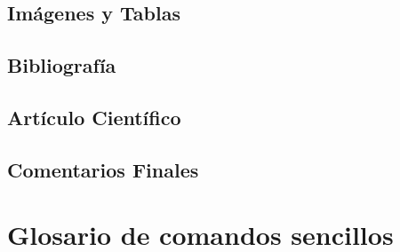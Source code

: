 \documentclass[10pt,letterpaper]{article}
\begin{document}
\subsection{Im\'agenes y Tablas}
\subsection{Bibliograf\'ia}
\subsection{Art\'iculo Cient\'ifico}
\subsection{Comentarios Finales}

\section{Glosario de comandos sencillos}
\end{document}
